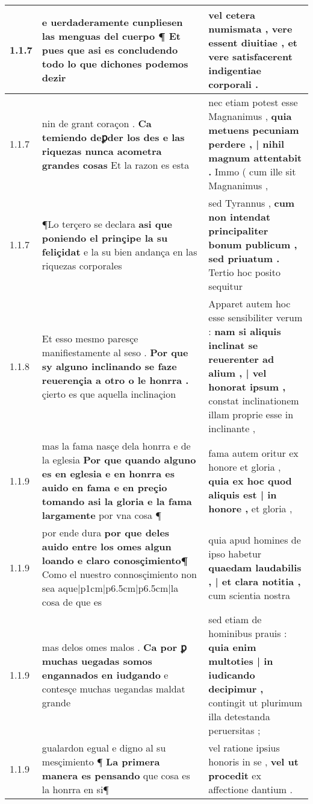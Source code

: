 \begin{tabular}{|p{1cm}|p{6.5cm}|p{6.5cm}|}
1.1.7 & e uerdaderamente cunpliesen las menguas del cuerpo ¶ \textbf{ Et pues que asi es concludendo todo lo que } dichones podemos dezir & vel cetera numismata , \textbf{ vere essent diuitiae , } et vere satisfacerent indigentiae corporali . \\\hline
1.1.7 & nin de grant coraçon . \textbf{ Ca temiendo deꝑder los des e las riquezas nunca acometra grandes cosas } Et la razon es esta & nec etiam potest esse Magnanimus , \textbf{ quia metuens pecuniam perdere , | nihil magnum attentabit . } Immo ( cum ille sit Magnanimus , \\\hline
1.1.7 & ¶Lo terçero se declara \textbf{ asi que poniendo el prinçipe la su feliçidat } e la su bien andança en las riquezas corporales & sed Tyrannus , \textbf{ cum non intendat principaliter bonum publicum , sed priuatum . } Tertio hoc posito sequitur \\\hline
1.1.8 & Et esso mesmo paresçe manifiestamente al seso . \textbf{ Por que sy alguno inclinando se faze reuerençia a otro o le honrra . } çierto es que aquella inclinaçion & Apparet autem hoc esse sensibiliter verum : \textbf{ nam si aliquis inclinat se reuerenter ad alium , | vel honorat ipsum , } constat inclinationem illam proprie esse in inclinante , \\\hline
1.1.9 & mas la fama nasçe dela honrra e de la eglesia \textbf{ Por que quando alguno es en eglesia e en honrra es auido en fama e en preçio tomando asi la gloria e la fama largamente } por vna cosa ¶ & fama autem oritur ex honore et gloria , \textbf{ quia ex hoc quod aliquis est | in honore , } et gloria , \\\hline
1.1.9 & por ende dura \textbf{ por que deles auido entre los omes algun loando e claro conosçimiento¶ } Como el nuestro connosçimiento non sea aque|p{1cm}|p{6.5cm}|p{6.5cm}|la cosa de que es & quia apud homines de ipso habetur \textbf{ quaedam laudabilis , | et clara notitia , } cum scientia nostra \\\hline
1.1.9 & mas delos omes malos . \textbf{ Ca por ꝑ muchas uegadas somos engannados en iudgando } e contesçe muchas uegandas maldat grande & sed etiam de hominibus prauis : \textbf{ quia enim multoties | in iudicando decipimur , } contingit ut plurimum illa detestanda peruersitas ; \\\hline
1.1.9 & gualardon egual e digno al su mesçimiento ¶ \textbf{ La primera manera es pensando } que cosa es la honrra en si¶ & vel ratione ipsius honoris in se , \textbf{ vel ut procedit } ex affectione dantium . \\\hline

\end{tabular}
